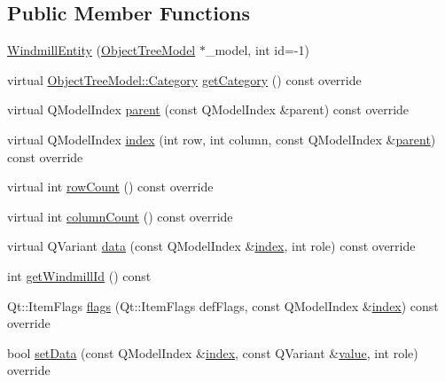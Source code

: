 \subsection*{Public Member Functions}
\begin{DoxyCompactItemize}
\item 
\mbox{\hyperlink{classobjecttree_1_1_windmill_entity_a5c3cf3cd54c64356c6ab8ecd4dcaaeea}{Windmill\+Entity}} (\mbox{\hyperlink{class_object_tree_model}{Object\+Tree\+Model}} $\ast$\+\_\+model, int id=-\/1)
\item 
virtual \mbox{\hyperlink{class_object_tree_model_a379e9d6b0d381853785adf62095ba4e3}{Object\+Tree\+Model\+::\+Category}} \mbox{\hyperlink{classobjecttree_1_1_windmill_entity_a48c08190b030e2c81fe8f3bf537de809}{get\+Category}} () const override
\item 
virtual Q\+Model\+Index \mbox{\hyperlink{classobjecttree_1_1_windmill_entity_afb4d86e4b6a73c8d5e834a16e6186f51}{parent}} (const Q\+Model\+Index \&parent) const override
\item 
virtual Q\+Model\+Index \mbox{\hyperlink{classobjecttree_1_1_windmill_entity_a319b7b2133002caa1c2be248e6711263}{index}} (int row, int column, const Q\+Model\+Index \&\mbox{\hyperlink{classobjecttree_1_1_windmill_entity_afb4d86e4b6a73c8d5e834a16e6186f51}{parent}}) const override
\item 
virtual int \mbox{\hyperlink{classobjecttree_1_1_windmill_entity_ad28bdc7cebee4f903a8cb2e5c84f70c5}{row\+Count}} () const override
\item 
virtual int \mbox{\hyperlink{classobjecttree_1_1_windmill_entity_a60196c3cff85af9e62db46dc72e8d0d8}{column\+Count}} () const override
\item 
virtual Q\+Variant \mbox{\hyperlink{classobjecttree_1_1_windmill_entity_a4b91c77b810fc3456d78f18daaad8362}{data}} (const Q\+Model\+Index \&\mbox{\hyperlink{classobjecttree_1_1_windmill_entity_a319b7b2133002caa1c2be248e6711263}{index}}, int role) const override
\item 
int \mbox{\hyperlink{classobjecttree_1_1_windmill_entity_ad6118a7456341410961896a09d074a64}{get\+Windmill\+Id}} () const
\item 
Qt\+::\+Item\+Flags \mbox{\hyperlink{classobjecttree_1_1_windmill_entity_a867c267caf8df2bbf9fd40903a5250d0}{flags}} (Qt\+::\+Item\+Flags def\+Flags, const Q\+Model\+Index \&\mbox{\hyperlink{classobjecttree_1_1_windmill_entity_a319b7b2133002caa1c2be248e6711263}{index}}) const override
\item 
bool \mbox{\hyperlink{classobjecttree_1_1_windmill_entity_abdd0b07f1aafee26616f46b9c0ce120f}{set\+Data}} (const Q\+Model\+Index \&\mbox{\hyperlink{classobjecttree_1_1_windmill_entity_a319b7b2133002caa1c2be248e6711263}{index}}, const Q\+Variant \&\mbox{\hyperlink{diffusion_8cpp_a4b41795815d9f3d03abfc739e666d5da}{value}}, int role) override
\end{DoxyCompactItemize}
